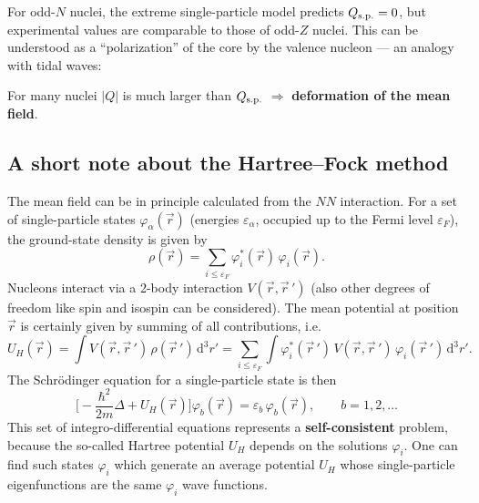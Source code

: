 \documentclass[11pt,a4paper]{article}
\newcommand{\ud}{\mathrm{d}}
\begin{document}
For odd-$N$ nuclei, the extreme single-particle model predicts $Q_{\rm s.p.}=0$, but experimental values are comparable to those of odd-$Z$ nuclei. This can be understood as a ``polarization'' of the core by the valence nucleon --- an analogy with tidal waves:
\begin{center}
\end{center}
For many nuclei $|Q|$ is much larger than $Q_{\rm s.p.}$ $\Rightarrow$ \textbf{deformation of the mean field}.

\subsection{A short note about the Hartree--Fock method}
The mean field can be in principle calculated from the $NN$ interaction. For a set of single-particle states $\varphi_\alpha(\vec r)$ (energies $\varepsilon_\alpha$, occupied up to the Fermi level $\varepsilon_F$), the ground-state density is given by
\[
\rho(\vec r)=\sum_{i\le\varepsilon_F}\varphi_i^*(\vec r)\,\varphi_i(\vec r).
\]
Nucleons interact via a 2-body interaction $V(\vec r,\vec r\,')$ (also other degrees of freedom like spin and isospin can be considered). The mean potential at position $\vec r$ is certainly given by summing of all contributions, i.e.
\[
U_H(\vec r)=\int V(\vec r,\vec r\,')\,\rho(\vec r\,')\,\ud^3r'
=\sum_{i\le\varepsilon_F}\int\varphi_i^*(\vec r\,')\,V(\vec r,\vec r\,')\,\varphi_i(\vec r\,')\,\ud^3r' .
\]
The Schr\"odinger equation for a single-particle state is then
\[
\Big[-\frac{\hbar^2}{2m}\Delta+U_H(\vec r)\Big]\varphi_b(\vec r)=\varepsilon_b\,\varphi_b(\vec r),\qquad b=1,2,\dots
\]
This set of integro-differential equations represents a \textbf{self-consistent} problem, because the so-called Hartree potential $U_H$ depends on the solutions $\varphi_i$. One can find such states $\varphi_i$ which generate an average potential $U_H$ whose single-particle eigenfunctions are the same $\varphi_i$ wave functions.
\end{document}
